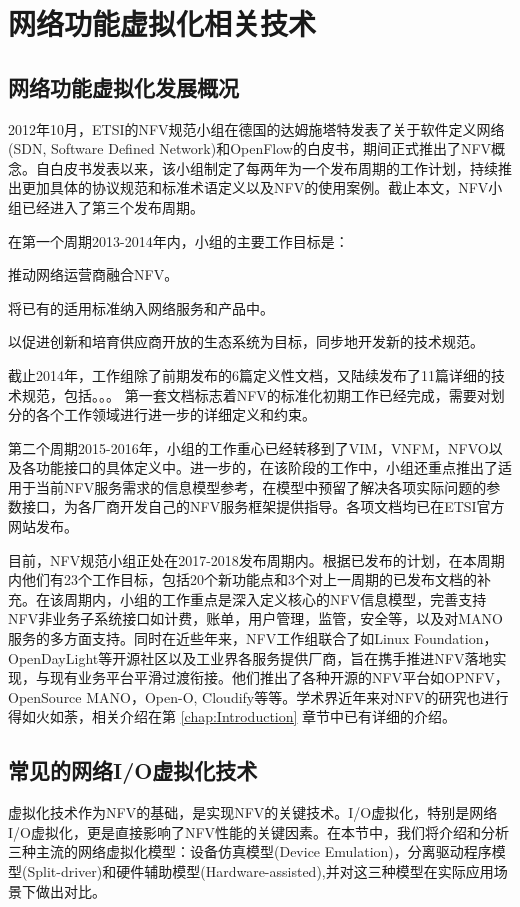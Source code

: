 \chapter{网络功能虚拟化相关技术}
\label{chap:relatedwork}

\section{网络功能虚拟化发展概况}
2012年10月，ETSI的NFV规范小组在德国的达姆施塔特发表了关于软件定义网络(SDN, Software Defined Network)和OpenFlow的白皮书，期间正式推出了NFV概念。自白皮书发表以来，该小组制定了每两年为一个发布周期的工作计划，持续推出更加具体的协议规范和标准术语定义以及NFV的使用案例。截止本文，NFV小组已经进入了第三个发布周期。

在第一个周期2013-2014年内，小组的主要工作目标是：
\begin{enumerate*}[label=\itshape\alph*)\upshape]
	\item 推动网络运营商融合NFV。
	\item 将已有的适用标准纳入网络服务和产品中。
	\item 以促进创新和培育供应商开放的生态系统为目标，同步地开发新的技术规范。
\end{enumerate*}
截止2014年，工作组除了前期发布的6篇定义性文档，又陆续发布了11篇详细的技术规范，包括。。。 第一套文档标志着NFV的标准化初期工作已经完成，需要对划分的各个工作领域进行进一步的详细定义和约束。

第二个周期2015-2016年，小组的工作重心已经转移到了VIM，VNFM，NFVO以及各功能接口的具体定义中。进一步的，在该阶段的工作中，小组还重点推出了适用于当前NFV服务需求的信息模型参考，在模型中预留了解决各项实际问题的参数接口，为各厂商开发自己的NFV服务框架提供指导。各项文档均已在ETSI官方网站发布。

目前，NFV规范小组正处在2017-2018发布周期内。根据已发布的计划，在本周期内他们有23个工作目标，包括20个新功能点和3个对上一周期的已发布文档的补充。在该周期内，小组的工作重点是深入定义核心的NFV信息模型，完善支持NFV非业务子系统接口如计费，账单，用户管理，监管，安全等，以及对MANO服务的多方面支持。同时在近些年来，NFV工作组联合了如Linux Foundation，OpenDayLight等开源社区以及工业界各服务提供厂商，旨在携手推进NFV落地实现，与现有业务平台平滑过渡衔接。他们推出了各种开源的NFV平台如OPNFV，OpenSource MANO，Open-O, Cloudify等等。学术界近年来对NFV的研究也进行得如火如荼，相关介绍在第 \ref{chap:Introduction} 章节中已有详细的介绍。


\section{常见的网络I/O虚拟化技术}
虚拟化技术作为NFV的基础，是实现NFV的关键技术。I/O虚拟化，特别是网络I/O虚拟化，更是直接影响了NFV性能的关键因素。在本节中，我们将介绍和分析三种主流的网络虚拟化模型：设备仿真模型(Device Emulation)，分离驱动程序模型(Split-driver)和硬件辅助模型(Hardware-assisted),并对这三种模型在实际应用场景下做出对比。

